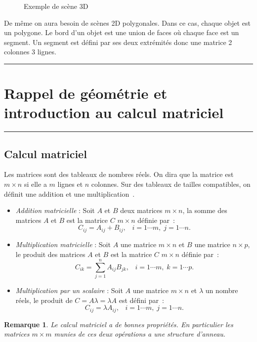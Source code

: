 \documentclass[a4paper,11pt]{amsart}
\newcommand{\dessin}[4]{
\begin{figure}[htb]
\centering
\HideDisplacementBoxes 
\BoxedEPSF{#1 scaled #2}
\caption{#3}
\label{#4}
\end{figure}}
\newtheorem{remarque}{Remarque} \newcommand{\AAA}{{\mathcal A}}
\begin{document}
\dessin{scene.epsf}{1000}{Exemple de sc\`ene 3D}{Web}

De m\^eme on aura besoin de sc\`enes 2D polygonales.  Dans ce cas, 
chaque objet est un polygone.  Le bord d'un objet est une union de 
faces o\`u chaque face est un segment.  Un segment est d\'efini par 
ses deux extr\'emit\'es donc une matrice 2 colonnes 3 lignes.

\vfill \newpage \vspace{0.5cm}\hrule
\section{Rappel de g\'eom\'etrie et introduction au calcul matriciel}
\hrule\vspace{0.5cm}

\subsection{Calcul matriciel}
Les matrices sont des tableaux de nombres r\'eels.  On dira que la 
matrice est $m\times n$ si elle a $m$ lignes et $n$ colonnes.  Sur des 
tableaux de tailles compatibles, on d\'efinit une addition et une 
multiplication~\cite{FOLE95}.
\begin{itemize}
\item \emph{Addition matricielle} : Soit $A$ et $B$ deux matrices 
$m\times n$, la somme des matrices $A$ et $B$ est la matrice $C$ 
$m\times n$ d\'efinie par~: $$C_{ij}=A_{ij}+B_{ij}, \;\;\; i=1\cdots 
m,\; j=1\cdots n.$$
%
\item \emph{Multiplication matricielle} : Soit $A$ une matrice 
$m\times n$ et $B$ une matrice $n\times p$, le produit des matrices 
$A$ et $B$ est la matrice $C$ $m\times n$ d\'efinie par~: 
$$C_{ik}=\sum_{j=1}^n A_{ij}B_{jk}, \;\;\; i=1\cdots m,\; k=1\cdots 
p.$$ \item \emph{Multiplication par un scalaire} : Soit $A$ une 
matrice $m\times n$ et $\lambda$ un nombre r\'eels, le produit de $C=A 
\lambda = \lambda A$ est d\'efini par~: $$C_{ij}=\lambda A_{ij},\;\;\; 
i=1\cdots m,\; j=1\cdots n.$$
\end{itemize}
%
\begin{remarque} Le calcul matriciel a de bonnes propri\'et\'es.  En 
parti\-culier les matrices $m\times m$ munies de ces deux op\'erations 
a une structure d'anneau.
\end{remarque}
\end{document}
